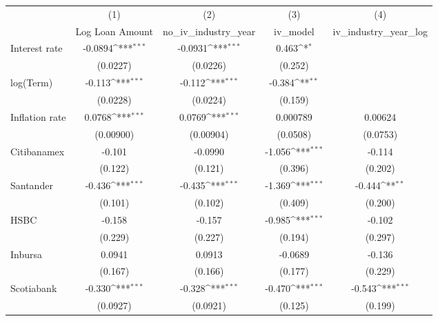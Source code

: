 {
\def\sym#1{\ifmmode^{#1}\else\(^{#1}\)\fi}
\begin{tabular}{l*{4}{c}}
\hline\hline
                &\multicolumn{1}{c}{(1)}&\multicolumn{1}{c}{(2)}&\multicolumn{1}{c}{(3)}&\multicolumn{1}{c}{(4)}\\
                &\multicolumn{1}{c}{Log Loan Amount}&\multicolumn{1}{c}{no_iv_industry_year}&\multicolumn{1}{c}{iv_model}&\multicolumn{1}{c}{iv_industry_year_log}\\
\hline
Interest rate   &  -0.0894\sym{***}&  -0.0931\sym{***}&    0.463\sym{*}  &                  \\
                & (0.0227)         & (0.0226)         &  (0.252)         &                  \\
log(Term)       &   -0.113\sym{***}&   -0.112\sym{***}&   -0.384\sym{**} &                  \\
                & (0.0228)         & (0.0224)         &  (0.159)         &                  \\
Inflation rate  &   0.0768\sym{***}&   0.0769\sym{***}& 0.000789         &  0.00624         \\
                &(0.00900)         &(0.00904)         & (0.0508)         & (0.0753)         \\
Citibanamex     &   -0.101         &  -0.0990         &   -1.056\sym{***}&   -0.114         \\
                &  (0.122)         &  (0.121)         &  (0.396)         &  (0.202)         \\
Santander       &   -0.436\sym{***}&   -0.435\sym{***}&   -1.369\sym{***}&   -0.444\sym{**} \\
                &  (0.101)         &  (0.102)         &  (0.409)         &  (0.200)         \\
HSBC            &   -0.158         &   -0.157         &   -0.985\sym{***}&   -0.102         \\
                &  (0.229)         &  (0.227)         &  (0.194)         &  (0.297)         \\
Inbursa         &   0.0941         &   0.0913         &  -0.0689         &   -0.136         \\
                &  (0.167)         &  (0.166)         &  (0.177)         &  (0.229)         \\
Scotiabank      &   -0.330\sym{***}&   -0.328\sym{***}&   -0.470\sym{***}&   -0.543\sym{***}\\
                & (0.0927)         & (0.0921)         &  (0.125)         &  (0.199)         \\

\end{tabular}}
